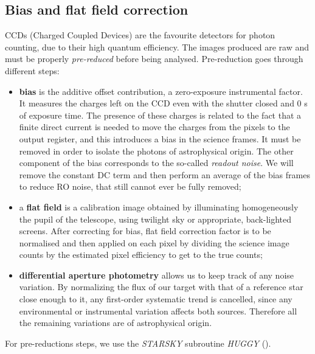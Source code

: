 \documentclass{aa}
\begin{document}
\subsection{Bias and flat field correction}
CCDs (Charged Coupled Devices) are the favourite detectors for photon counting, 
due to their high quantum efficiency. The images produced are raw
and must be properly \textit{pre-reduced} before being analysed. Pre-reduction goes through different steps:
\begin{itemize}
    \item \textbf{bias} is the additive offset contribution, a zero-exposure instrumental factor. It measures the charges left on the CCD even with the shutter closed and 0 s of exposure time. The presence of these charges is related to the fact that a finite direct current is needed to move the charges from the pixels to the output register, and this introduces a bias in the science frames.  It must be removed in order to isolate the photons of astrophysical origin. The other component of the bias corresponds to the so-called \textit{readout noise}. We will remove the constant DC term and then perform an average of the bias frames to reduce RO noise, that still cannot ever be fully removed;
    \item a \textbf{flat field} is a calibration image obtained by illuminating homogeneously the pupil of the telescope, using twilight sky or appropriate, back-lighted screens. After correcting for bias, flat field correction factor is to be normalised and then applied on each pixel by dividing the science image counts by the estimated pixel efficiency to get to the true counts;
    \item \textbf{differential aperture photometry} allows us to keep track of any noise variation. By normalizing the flux of our target with that of a reference star close enough to it, any first-order systematic trend is cancelled, since any environmental or instrumental variation affects both sources. Therefore all the remaining variations are of astrophysical origin.
\end{itemize}
For pre-reductions steps, we use the \textit{STARSKY} subroutine \textit{HUGGY} (\cite{Nascimbeni}). 
\end{document}
